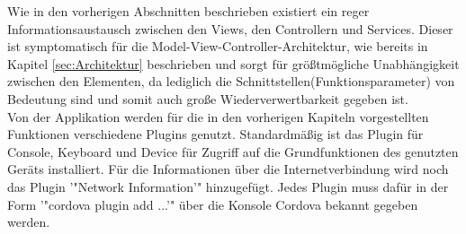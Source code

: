 Wie in den vorherigen Abschnitten beschrieben existiert ein reger Informationsaustausch zwischen den Views, den Controllern und Services. Dieser ist symptomatisch für die Model-View-Controller-Architektur, wie bereits in Kapitel \ref{sec:Architektur} beschrieben und sorgt für größtmögliche Unabhängigkeit zwischen den Elementen, da lediglich die Schnittstellen(Funktionsparameter) von Bedeutung sind und somit auch große Wiederverwertbarkeit gegeben ist.
\\
Von der Applikation werden für die in den vorherigen Kapiteln vorgestellten Funktionen verschiedene Plugins genutzt.
Standardmäßig ist das Plugin für Console, Keyboard und Device für Zugriff auf die Grundfunktionen des genutzten Geräts installiert. Für die Informationen über die Internetverbindung wird noch das Plugin '"Network Information'" hinzugefügt. Jedes Plugin muss dafür in der Form '"cordova plugin add ...'" über die Konsole Cordova bekannt gegeben werden.

\newpage

